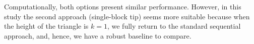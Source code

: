 \documentclass[11pt, a4paper]{article}
\begin{document}
\begin{enumerate}[label={\textbf{Exercise \arabic*:}}]
\begin{enumerate}
  Computationally, both options present similar performance. However, in this study the second approach (single-block tip) seems more suitable because when the height of the triangle is $k=1$, we fully return to the standard sequential approach, and, hence, we have a robust baseline to compare. 

\end{enumerate}

\end{enumerate}
\end{document}
